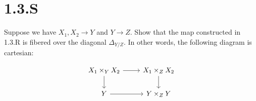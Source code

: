 \documentclass{article}
\begin{document}
\section{1.3.S}
\begin{theorem}
    Suppose we have $X_1,X_2 \to Y$ and $Y \to Z$. Show that
    the map constructed in 1.3.R is fibered over the diagonal
    $\Delta_{Y/Z}$. In other words, the following diagram is cartesian:

    \[\begin{tikzcd}
            {X_1 \times_YX_2} & {X_1 \times_ZX_2} \\
            Y                 & {Y\times_ZY}
            \arrow[from=1-1, to=2-1]
            \arrow[from=1-1, to=1-2]
            \arrow[from=1-2, to=2-2]
            \arrow[from=2-1, to=2-2]
        \end{tikzcd}\]
\end{theorem}
\end{document}
